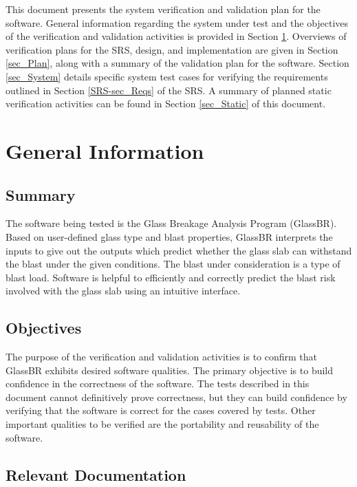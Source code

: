 \documentclass[12pt, titlepage]{article}
\newcommand{\progname}{GlassBR}
\begin{document}

\noindent This document presents the system verification and validation plan 
for the software. General information regarding the system under test and the 
objectives of the verification and validation activities is provided in Section 
\ref{sec_GenInfo}. Overviews of verification plans for the SRS, design, and 
implementation are given in Section \ref{sec_Plan}, along with a summary of the 
validation plan for the software. Section \ref{sec_System} details specific  
system test cases for verifying the requirements outlined in Section 
\ref{SRS-sec_Reqs} of the SRS. A summary of planned static verification 
activities can be found in Section \ref{sec_Static} of this document.

\section{General Information} \label{sec_GenInfo}

\subsection{Summary}

\noindent The software being tested is the Glass Breakage Analysis Program 
(\progname{}). Based on user-defined glass type and blast properties,
\progname{} interprets the inputs to give out the outputs which
predict whether the glass slab can withstand the blast under the given conditions. The blast under
consideration is a type of  blast load. Software is helpful to efficiently and correctly
predict the blast risk involved with the glass slab using an intuitive interface.

\subsection{Objectives}

\noindent The purpose of the verification and validation activities is to 
confirm that \progname{} exhibits desired software qualities. The primary 
objective is to build confidence in the correctness of the software. The tests 
described in this document cannot definitively prove correctness, but they can 
build confidence by verifying that the software is correct for the cases 
covered by tests. Other important qualities to be verified are the 
portability and reusability of the software.

\subsection{Relevant Documentation}
\end{document}
